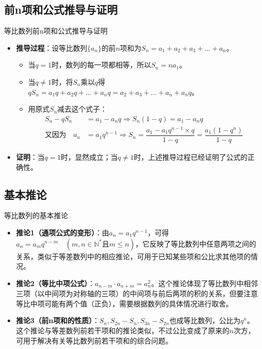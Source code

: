 \documentclass[aspectratio=169]{ctexbeamer} %
\begin{document}
\subsection{前n项和公式推导与证明}
\begin{frame}{等比数列前n项和公式推导与证明}
\begin{itemize}
\item \textbf{推导过程}：设等比数列$\{a_n\}$的前$n$项和为$S_n = a_1 + a_2 + a_3 + \dots + a_n$。
\begin{itemize}
\item 当$q = 1$时，数列的每一项都相等，所以$S_n = n a_1$。
\item 当$q \neq 1$时，将$S_n$乘以$q$得$q S_n = a_1 q + a_2 q + \dots + a_n q = a_2 + a_3 + \dots + a_n + a_n q$。
\item 用原式$S_n$减去这个式子：
\begin{align*}
S_n - q S_n &= a_1 - a_n q \Rightarrow S_n (1 - q) = a_1 - a_n q \\
\text{又因为}\quad a_n &= a_1 q^{n-1} \Rightarrow S_n = \dfrac{a_1 - a_1 q^{n-1} \times q}{1 - q} = \dfrac{a_1 (1 - q^n)}{1 - q}
\end{align*}
\end{itemize}
\item \textbf{证明}：当$q = 1$时，显然成立；当$q \neq 1$时，上述推导过程已经证明了公式的正确性。
\end{itemize}
\end{frame}

\subsection{基本推论}
\begin{frame}{等比数列的基本推论}
\begin{itemize}
\item \textbf{推论1（通项公式的变形）}：由$a_n = a_1 q^{n-1}$，可得$a_n = a_m q^{n-m}\quad(m, n \in \mathbb{N}^* \text{且} m \leq n)$，它反映了等比数列中任意两项之间的关系，类似于等差数列中的相应推论，可用于已知某些项和公比求其他项的情况。
\item \textbf{推论2（等比中项公式）}：$a_{n-m} \cdot a_{n+m} = a_n^2$。这个推论体现了等比数列中相邻三项（以中间项为对称轴的三项）的中间项与前后两项的积的关系，但要注意等比中项可能有两个值（正负），需要根据数列的具体情况进行取舍。
\item \textbf{推论3（前n项和的性质）}：$S_n, S_{2n} - S_n, S_{3n} - S_{2n}$也成等比数列，公比为$q^n$。这个推论与等差数列前若干项和的推论类似，不过公比变成了原来的$n$次方，可用于解决有关等比数列前若干项和的综合问题。
\end{itemize}
\end{frame}
\end{document}
